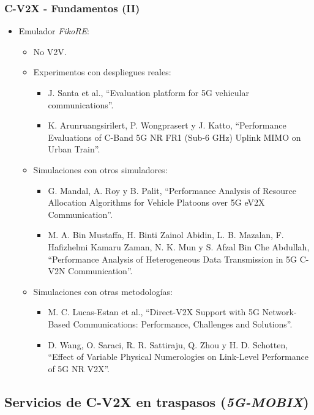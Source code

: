 \documentclass{beamer}
\begin{document}
\begin{frame}
\frametitle{C-V2X - Fundamentos (II)}

\begin{itemize}
\item {
	Emulador \textit{FikoRE}:
	\begin{itemize}
	\item No V2V.
	\item {
		Experimentos con despliegues reales:
		\begin{itemize}
		\item J. Santa et al., ``Evaluation platform for 5G vehicular communications''.
		\item K. Arunruangsirilert, P. Wongprasert y J. Katto, ``Performance Evaluations of C-Band 5G NR FR1 (Sub-6 GHz) Uplink MIMO on Urban Train''.
		\end{itemize}
	}
	\item {
		Simulaciones con otros simuladores:
		\begin{itemize}
		\item G. Mandal, A. Roy y B. Palit, ``Performance Analysis of Resource Allocation Algorithms for Vehicle Platoons over 5G eV2X Communication''.
		\item M. A. Bin Mustaffa, H. Binti Zainol Abidin, L. B. Mazalan, F. Hafizhelmi Kamaru Zaman, N. K. Mun y S. Afzal Bin Che Abdullah, ``Performance Analysis of Heterogeneous Data Transmission in 5G C-V2N Communication''.
		\end{itemize}
	}
	\item {
		Simulaciones con otras metodologías:
		\begin{itemize}
		\item M. C. Lucas-Estan et al., ``Direct-V2X Support with 5G Network-Based Communications: Performance, Challenges and Solutions''.
		\item D. Wang, O. Saraci, R. R. Sattiraju, Q. Zhou y H. D. Schotten, ``Effect of Variable Physical Numerologies on Link-Level Performance of 5G NR V2X''.
		\end{itemize}
	}
	\end{itemize}
}
\end{itemize}
\end{frame}

\subsection{Servicios de C-V2X en traspasos (\textit{5G-MOBIX})}
\end{document}
